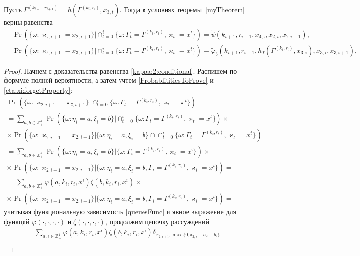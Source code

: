 \documentclass[a4paper,12pt,russian]{extarticle}
\newcommand{\mll}[1]{\begin{multline*}#1\end{multline*}}
\begin{document}
\begin{corollary}
Пусть $\Gamma^{(k_{i+1},r_{i+1})}=h(\Gamma^{(k_i,r_i)},x_{3,t})$. Тогда в условиях теоремы~\ref{myTheorem} верны равенства
\begin{align}
&\Pr (\{ \omega \colon \varkappa_{2,i+1} = x_{2,i+1}\} |\cap_{t=0}^{i}\{\omega\colon \Gamma_t=\Gamma^{(k_t,r_t)}, \varkappa_t=x^t\})=\widetilde{\psi}(k_{i+1},r_{i+1},x_{4,i},x_{2,i},x_{2,i+1}),
\label{kappa:2:conditional}\\
&\Pr (\{ \omega \colon \varkappa_{3,i+1} = x_{3,i+1}\} |\cap_{t=0}^{i}\{\omega\colon \Gamma_t=\Gamma^{(k_t,r_t)}, \varkappa_t=x^t\})=\widetilde{\varphi}_3(k_{i+1},r_{i+1},h_T(\Gamma^{(k_i,r_i)},x_{3,i}),x_{3,i},x_{3,i+1}),
\label{kappa:3:conditional}
\end{align}
\end{corollary}
\begin{proof}
Начнем с доказательства равенства \eqref{kappa:2:conditional}. Распишем по формуле полной вероятности, а затем учтем \eqref{ProbablititiesToProve} и \eqref{eta:xi:forgetProperty}:
\mll
{
\Pr (\{ \omega \colon \varkappa_{2,i+1} = x_{2,i+1}\} |\cap_{t=0}^{i}\{\omega\colon \Gamma_t=\Gamma^{(k_t,r_t)}, \varkappa_t=x^t\}) = \\
= \sum_{a,b\in \mathbb{Z}_+^4} \Pr (\{ \omega \colon \eta_i=a, \xi_i=b\} |\cap_{t=0}^{i}\{\omega\colon \Gamma_t=\Gamma^{(k_t,r_t)}, \varkappa_t=x^t\}) \times \\
\times \Pr (\{ \omega \colon \varkappa_{2,i+1} = x_{2,i+1}\} |\{\omega\colon \eta_i=a, \xi_i=b\}\cap \cap_{t=0}^{i}\{\omega\colon \Gamma_t=\Gamma^{(k_t,r_t)}, \varkappa_t=x^t\}) = \\
=\sum_{a,b\in \mathbb{Z}_+^4} \Pr (\{ \omega \colon \eta_i=a, \xi_i=b\} |\{\omega\colon \Gamma_i=\Gamma^{(k_i,r_i)}, \varkappa_i=x^i\}) \times \\
\times \Pr (\{ \omega \colon \varkappa_{2,i+1} = x_{2,i+1}\} |\{\omega\colon \eta_i=a, \xi_i=b, \Gamma_i=\Gamma^{(k_i,r_i)}, \varkappa_i=x^i\}) = \\
=\sum_{a,b\in \mathbb{Z}_+^4} \varphi(a,k_i,r_i,x^i)\zeta(b,k_i,r_i,x^i) \times\\
\times \Pr (\{ \omega \colon \varkappa_{2,i+1} = x_{2,i+1}\} |\{\omega\colon \eta_i=a, \xi_i=b, \Gamma_i=\Gamma^{(k_i,r_i)}, \varkappa_i=x^i\})=
}
учитывая функциональную зависимость \eqref{queuesFunc} и явное выражение для функций $\varphi(\cdot, \cdot, \cdot, \cdot)$ и $\zeta(\cdot, \cdot, \cdot, \cdot)$, продолжим цепочку рассуждений
\mll
{
= \sum_{a,b\in \mathbb{Z}_+^4} \varphi(a,k_i,r_i,x^i)\zeta(b,k_i,r_i,x^i)  \delta_{x_{2,i+1},\max\{0,x_{2,i}+a_2-b_2\}} =\\
}
\end{proof}
\end{document}
